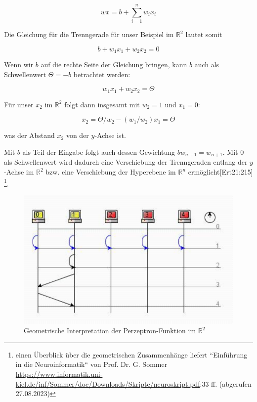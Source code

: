 \begin{equation}
wx = b + \sum^n_{i=1} w_ix_i
\label{eq:gl-net}
\end{equation}

\noindent
Die Gleichung für die Trenngerade für unser Beispiel im $\mathbb{R}^2$ lautet somit

\begin{equation}
b + w_1x_1 + w_2x_2 = 0
\end{equation}

\noindent
Wenn wir $b$ auf die rechte Seite der Gleichung bringen, kann $b$ auch als Schwellenwert $\Theta = -b$ betrachtet werden:

\begin{equation}
w_1x_1 + w_2x_2 = \Theta
\end{equation}

\noindent
Für unser $x_2$ im $ \mathbb{R}^2$ folgt dann insgesamt mit $w_2 = 1$ und $x_1 = 0$:

\begin{equation}
x_2 = \Theta/w_2 -(w_1/w_2)x_1  = \Theta
\end{equation}

\noindent
was der Abstand $x_2$ von der $y$-Achse ist.

\noindent
Mit $b$ als Teil der Eingabe folgt auch dessen Gewichtung $bw_{n+1} = w_{n+1}$.
Mit $0$ als Schwellenwert wird dadurch eine Verschiebung der Trenngeraden entlang der $y$-Achse im $ \mathbb{R}^2$ bzw. eine Verschiebung der Hyperebene im $ \mathbb{R}^n$ ermöglicht[Ert21:215] \footnote{
    einen Überblick über die geometrischen Zusammenhänge liefert ``Einführung in die Neuroinformatik`` von Prof. Dr. G. Sommer \url{https://www.informatik.uni-kiel.de/inf/Sommer/doc/Downloads/Skripte/neuroskript.pdf}:33 ff. (abgerufen 27.08.2023)
}.

\begin{figure}[h]
    \centering
    \includegraphics{images/p1ReadSeq.pdf}
    \caption{Geometrische Interpretation der Perzeptron-Funktion im $\mathbb{R}^2$}
    \label{fig-geominterpretation}
\end{figure}

